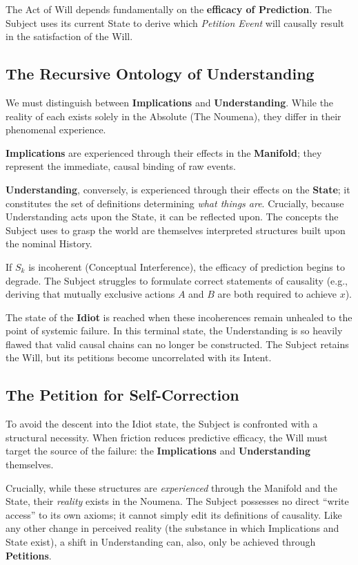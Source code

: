 \documentclass[11pt, a4paper]{article}
\theoremstyle{formalism}
\begin{document}
{The Act of Will depends fundamentally on the \textbf{efficacy of Prediction}. 
The Subject uses its current State to derive which \textit{Petition Event} will 
causally result in the satisfaction of the Will.

\subsection{The Recursive Ontology of Understanding}

We must distinguish between \textbf{Implications} and \textbf{Understanding}. 
While the reality of each exists solely in the Absolute (The Noumena), they 
differ in their phenomenal experience.

\textbf{Implications} are experienced through their effects in the 
\textbf{Manifold}; they represent the immediate, causal binding of raw events. 

\textbf{Understanding}, conversely, is experienced through their effects on the 
\textbf{State}; it constitutes the set of definitions determining \textit{what things are}. 
Crucially, because Understanding acts upon the State, it can be reflected 
upon. The concepts the Subject uses to grasp the world are themselves 
interpreted structures built upon the nominal History.

If $S_k$ is incoherent (Conceptual Interference), the efficacy of prediction 
begins to degrade. The Subject struggles to formulate correct statements of 
causality (e.g., deriving that mutually exclusive actions $A$ and $B$ are 
both required to achieve $x$).

The state of the \textbf{Idiot} is reached when these incoherences remain 
unhealed to the point of systemic failure. In this terminal state, the 
Understanding is so heavily flawed that valid causal chains can no longer be 
constructed. The Subject retains the Will, but its petitions become 
uncorrelated with its Intent.

\subsection{The Petition for Self-Correction}

To avoid the descent into the Idiot state, the Subject is confronted with a 
structural necessity. When friction reduces predictive efficacy, the Will must 
target the source of the failure: the \textbf{Implications} and 
\textbf{Understanding} themselves.

Crucially, while these structures are \textit{experienced} through the 
Manifold and the State, their \textit{reality} exists in the Noumena. 
The Subject possesses no direct ``write access'' to its own axioms; it cannot 
simply edit its definitions of causality. Like any other change in perceived reality 
(the substance in which Implications and State exist), a shift in Understanding 
can, also, only be achieved through \textbf{Petitions}.

}
\end{document}
